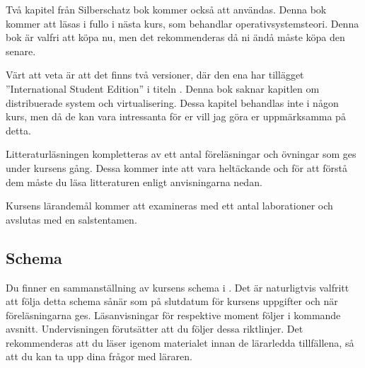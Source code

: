 \documentclass[a4paper,logo]{miunart}
\begin{document}
Två kapitel från Silberschatz bok  
\cite{Silberschatz2013intl,Silberschatz2013osc} kommer också att användas.
Denna bok kommer att läsas i fullo i nästa kurs, som behandlar 
operativsystemsteori.
Denna bok är valfri att köpa nu, men det rekommenderas då ni ändå måste köpa 
den senare.

Värt att veta är att det finns två versioner, där den ena har tillägget 
''International Student Edition'' i titeln \cite{Silberschatz2013intl}.
Denna bok saknar kapitlen om distribuerade system och virtualisering.
Dessa kapitel behandlas inte i någon kurs, men då de kan vara intressanta för 
er vill jag göra er uppmärksamma på detta.

Litteraturläsningen kompletteras av ett antal föreläsningar och övningar som 
ges under kursens gång.
Dessa kommer inte att vara heltäckande och för att förstå dem måste du läsa 
litteraturen enligt anvisningarna nedan.

Kursens lärandemål kommer att examineras med ett antal laborationer och 
avslutas med en salstentamen.

\subsection{Schema}
\label{sec:schedule}
Du finner en sammanställning av kursens schema i .
Det är naturligtvis valfritt att följa detta schema sånär som på slutdatum för 
kursens uppgifter och när föreläsningarna ges.
Läsanvisningar för respektive moment följer i kommande avsnitt.
Undervisningen förutsätter att du följer dessa riktlinjer.
Det rekommenderas att du läser igenom materialet innan de lärarledda 
tillfällena, så att du kan ta upp dina frågor med läraren.
\end{document}
